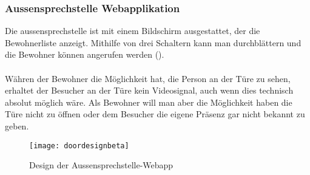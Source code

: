 \subsubsection{Aussensprechstelle Webapplikation}
\label{sec:AussensprechstelleWebapplikation}
Die \gls{aussensprechstelle} ist mit einem Bildschirm ausgestattet, der die Bewohnerliste anzeigt. Mithilfe von drei Schaltern kann man durchblättern und die Bewohner können angerufen werden ().
\\
\\
Währen der Bewohner die Möglichkeit hat, die Person an der Türe zu sehen, erhaltet der Besucher an der Türe kein Videosignal, auch wenn dies technisch absolut möglich wäre. Als Bewohner will man aber die Möglichkeit haben die Türe nicht zu öffnen oder dem Besucher die eigene Präsenz gar nicht bekannt zu geben.

\begin{figure}[htb!]
	\begin{center}
		\texttt{[image: doordesignbeta]}
		\caption[Design der Client-Webapp]{Design der Aussensprechstelle-Webapp}
		\label{fig:doordesign}
	\end{center}
\end{figure}


